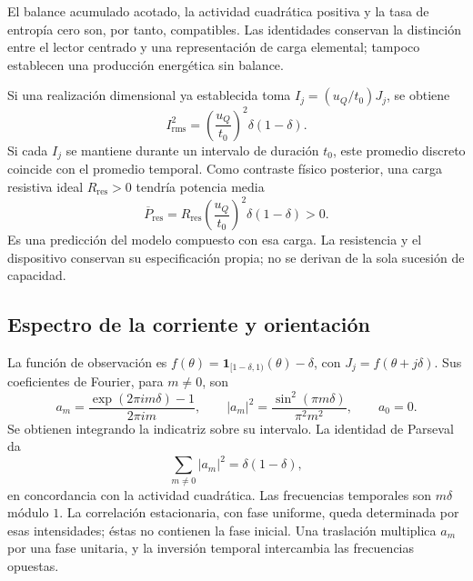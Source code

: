 El balance acumulado acotado, la actividad cuadrática positiva y la tasa de
entropía cero son, por tanto, compatibles. Las identidades conservan la
distinción entre el lector centrado y una representación de carga
elemental; tampoco establecen una producción energética sin balance.

Si una realización dimensional ya establecida toma
$I_j=(u_Q/t_0)J_j$, se obtiene
\begin{equation}
 I_{\mathrm{rms}}^2
 =\left(\frac{u_Q}{t_0}\right)^2\delta(1-\delta).
 \label{md:cron:eficaz}
\end{equation}
Si cada $I_j$ se mantiene durante un intervalo de duración $t_0$, este
promedio discreto coincide con el promedio temporal.
Como contraste físico posterior, una carga resistiva ideal
$R_{\mathrm{res}}>0$ tendría potencia media
\begin{equation}
 \overline P_{\mathrm{res}}
 =R_{\mathrm{res}}\left(\frac{u_Q}{t_0}\right)^2
 \delta(1-\delta)>0.
 \label{md:cron:potencia-resistiva}
\end{equation}
Es una predicción del modelo compuesto con esa carga. La resistencia y el
dispositivo conservan su especificación propia; no se derivan de la sola
sucesión de capacidad.

\subsection{Espectro de la corriente y orientación}
\label{md:cron:espectro}

La función de observación es
$f(\theta)=\mathbf1_{[1-\delta,1)}(\theta)-\delta$, con
$J_j=f(\theta+j\delta)$. Sus coeficientes de Fourier, para $m\neq0$, son
\begin{equation}
 a_m=\frac{\exp(2\pi i m\delta)-1}{2\pi i m},\qquad
 |a_m|^2=\frac{\sin^2(\pi m\delta)}{\pi^2m^2},\qquad
 a_0=0.
 \label{md:cron:fourier}
\end{equation}
Se obtienen integrando la indicatriz sobre su intervalo. La identidad de
Parseval da
\begin{equation}
 \sum_{m\neq0}|a_m|^2=\delta(1-\delta),
 \label{md:cron:parseval}
\end{equation}
en concordancia con la actividad cuadrática. Las frecuencias temporales
son $m\delta$ módulo $1$. La correlación estacionaria, con fase uniforme,
queda determinada por esas intensidades; éstas no contienen la fase inicial.
Una traslación multiplica $a_m$ por una fase unitaria, y la inversión
temporal intercambia las frecuencias opuestas.

